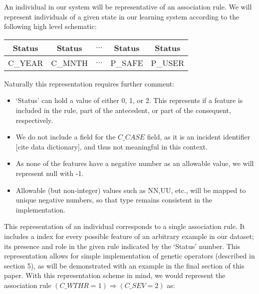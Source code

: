 \documentclass{amsart}
\theoremstyle{definition}
\theoremstyle{remark}
\numberwithin{equation}{section}
\begin{document}
An individual in our system will be representative of an association rule. We will represent individuals of a given state in our learning system according to the following high level schematic:
\vspace{.5cm}

\begin{center}
\begin{tabular}{ | c | c | c | c | c |}
 \hline
 Status & Status & $\hdots$ & Status & Status\\
 \hline
 C\_YEAR  & C\_MNTH  & $\hdots$ & P\_SAFE & P\_USER  \\
\hline
\end{tabular}
\end{center}

\vspace{.5cm}
Naturally this representation requires further comment: 
\begin{itemize}
	\item `Status' can hold a value of either 0, 1, or 2. This represents if a feature is included in the rule, part of the antecedent, or part of the consequent, respectively.  
	\item We do not include a field for the $C\_CASE$ field, as it is an incident identifier [cite data dictionary], and thus not meaningful in this context. 
	\item As none of the features have a negative number as an allowable value, we will represent null with -1.
	\item Allowable (but non-integer) values such as NN,UU, etc., will be mapped to unique negative numbers, so that type remains consistent in the implementation.
\end{itemize}

This representation of an individual corresponds to a single association rule. It includes a index for every possible feature of an arbitrary example in our dataset; its presence and role in the given rule indicated by the `Status' number. This representation allows for simple implementation of genetic operators (described in section 5), as will be demonstrated with an example in the final section of this paper. With this representation scheme in mind, we would represent the association rule $(C\_WTHR = 1)\Rightarrow (C\_SEV = 2)$ as:
\end{document}
